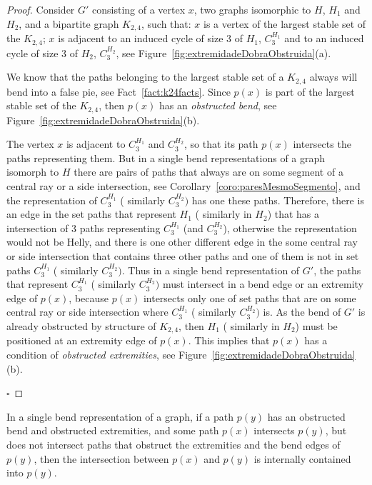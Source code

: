 \documentclass[runningheads]{llncs}
\begin{document}
\begin{proof} %
Consider $G'$ consisting of a vertex $x$, two graphs isomorphic to $H$, $ H_1 $ and $ H_2 $, and a bipartite graph $K_{2,4}$, such that: $x$ is a vertex of the largest stable set of the $K_{2,4}$; $x$ is adjacent to an induced cycle of size 3 of $H_1$, $C_3^{H_1}$ and to an induced cycle of size 3 of $H_2$, $ C_3^{H_2}$, see Figure~\ref{fig:extremidadeDobraObstruida}(a).

We know that the paths belonging to the largest stable set of a $K_{2,4}$ always will bend into a false pie, see Fact~\ref{fact:k24facts}. Since $p(x)$ is part of the largest stable set of the $K_{2,4}$, then $p(x)$ has an \emph {obstructed bend}, see Figure~\ref{fig:extremidadeDobraObstruida}(b). 

The vertex $x$ is adjacent to $ C_{3}^{H_1}$ and $ C_3^{H_2}$, so that its path $ p(x) $ intersects the paths representing them.  But in a single bend representations of a graph isomorph to $H$ there are pairs of paths that always are on some segment of a central ray or a side intersection, see Corollary~\ref{coro:paresMesmoSegmento}, and the representation of $C_{3}^{H_1}$ ( similarly $C_3^{H_2})$ has one these paths. Therefore, there is an edge in the set paths that represent ${H_1}$ ( similarly in ${H_2}$) that has a intersection of 3 paths representing $ C_{3}^{H_1}$ (and $ C_3^{H_2}$), otherwise the representation would not be Helly, and there is one other different edge in the some central ray or side intersection that contains three other paths and one of them is not in set paths  $C_{3}^{H_1}$ ( similarly $C_3^{H_2})$. Thus in a single bend representation of $G'$, the paths that represent  $C_{3}^{H_1}$ ( similarly $C_3^{H_2})$ must intersect in a bend edge or an extremity edge of $p(x)$, because $p(x)$ intersects only one of set paths that are on some central ray or side intersection where  $C_{3}^{H_1}$ ( similarly $C_3^{H_2})$ is. As the bend of $G'$ is already obstructed by structure of $K_{2,4}$, then ${H_1}$ ( similarly in ${H_2}$) must be positioned at an extremity edge of $p(x)$. This implies that $ p(x) $ has a condition of \emph{obstructed extremities}, see Figure~\ref{fig:extremidadeDobraObstruida}(b).

$\square$ \end{proof}

\begin{remark} %
In a single bend representation of a graph, if a path $p(y)$ has an obstructed bend and obstructed extremities, and some path $p(x)$ intersects $p(y)$, but does not intersect paths that obstruct the extremities and the bend edges of $p(y)$, then the intersection between $p(x)$ and $p(y)$ is internally contained into $p(y)$. 
\end{remark}
\end{document}

